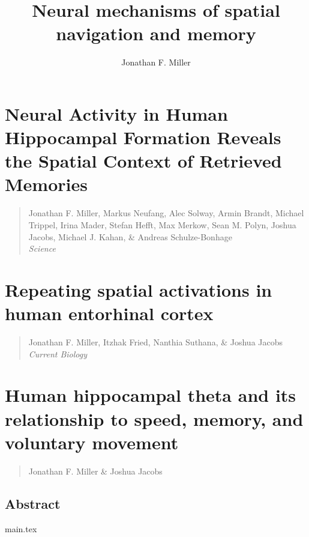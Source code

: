 \documentclass[final,subfig,blackref,approvalform]{drexel-thesis} %
\author{Jonathan F. Miller}
\title{Neural mechanisms of spatial navigation and memory}
\begin{document}


\begin{thesis}
  
    

    \chapter{Neural Activity in Human Hippocampal Formation Reveals the Spatial Context of Retrieved Memories}
    \begin{quotation}
    \singlespacing
    \noindent Jonathan F. Miller, Markus Neufang, Alec Solway, Armin Brandt, Michael Trippel, Irina Mader, Stefan Hefft, Max Merkow, Sean M.  Polyn, Joshua Jacobs, Michael J. Kahan, \& Andreas Schulze-Bonhage  \\ \textit{Science}
    \end{quotation}
    

    \chapter{Repeating spatial activations in human entorhinal cortex}
    \begin{quotation}
    \singlespacing
    \noindent Jonathan F. Miller, Itzhak Fried, Nanthia Suthana, \& Joshua Jacobs \\ \textit{Current Biology}
    \end{quotation}
    
	
    \chapter{Human hippocampal theta and its relationship to speed, memory, and voluntary movement}
    \begin{quotation}
    \singlespacing
    \noindent Jonathan F. Miller \& Joshua Jacobs \\
    \end{quotation}	

    \section{Abstract}
    
    {main.tex}
    

    


  
\end{thesis}

 


% 
% 
\end{document}
